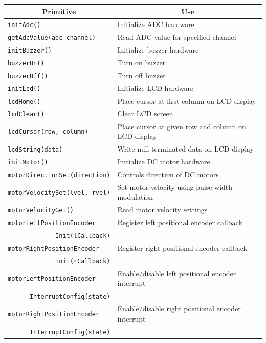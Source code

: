 \documentclass[a4paper, 12pt]{article}
\begin{document}
\begin{table}
 \centering
 \begin{tabular}{|l|l|}
 \hline
 \multicolumn{1}{|c|}{\textbf{Primitive}} & \multicolumn{1}{|c|}{\textbf{Use}}\\
 \hline \hline
 \texttt{initAdc()} & Initialize ADC hardware\\
 \texttt{getAdcValue(adc\_channel)} & Read ADC value for specified channel\\
 \hline
 \texttt{initBuzzer()} & Initialize buzzer hardware\\
 \texttt{buzzerOn()} & Turn on buzzer\\
 \texttt{buzzerOff()} & Turn off buzzer\\
 \hline
 \texttt{initLcd()} & Initialize LCD hardware\\
 \texttt{lcdHome()} & Place cursor at first column on LCD display\\
 \texttt{lcdClear()} & Clear LCD screen\\
 \texttt{lcdCursor(row, column)} & Place cursor at given row and column on LCD display\\
 \texttt{lcdString(data)} & Write null terminated data on LCD display\\
 \hline
 \texttt{initMotor()} & Initialize DC motor hardware\\
 \texttt{motorDirectionSet(direction)} & Controls direction of DC motors\\
 \texttt{motorVelocitySet(lvel, rvel)} & Set motor velocity using pulse width modulation\\
 \texttt{motorVelocityGet()} & Read motor velocity settings\\
 \texttt{motorLeftPositionEncoder} & Register left positional encoder callback\\
 \multicolumn{1}{|r|}{\texttt{Init(lCallback)}} & \\
 \texttt{motorRightPositionEncoder} & Register right positional encoder callback\\
 \multicolumn{1}{|r|}{\texttt{Init(rCallback)}} & \\
 \texttt{motorLeftPositionEncoder} & Enable/disable left positional encoder interrupt\\
 \multicolumn{1}{|r|}{\texttt{InterruptConfig(state)}} &  \\
 \texttt{motorRightPositionEncoder} & Enable/disable right positional encoder interrupt\\
 \multicolumn{1}{|r|}{\texttt{InterruptConfig(state)}} & \\

\end{tabular}
\end{table}
\end{document}
